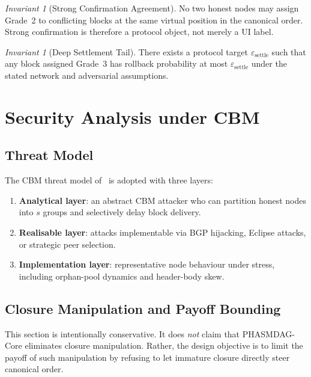 \documentclass[11pt]{article}
\theoremstyle{definition}
\theoremstyle{plain}
\theoremstyle{remark}
\newtheorem{invariant}[definition]{Invariant}
\begin{document}
\begin{invariant}[Strong Confirmation Agreement]\label{inv:strong}
No two honest nodes may assign Grade~2 to conflicting blocks at the same
virtual position in the canonical order.
Strong confirmation is therefore a protocol object, not merely a UI label.
\end{invariant}

\begin{invariant}[Deep Settlement Tail]\label{inv:settlement}
There exists a protocol target $\varepsilon_{\mathrm{settle}}$ such that any
block assigned Grade~3 has rollback probability at most
$\varepsilon_{\mathrm{settle}}$ under the stated network and adversarial
assumptions.
\end{invariant}

\section{Security Analysis under CBM}\label{sec:security}

\subsection{Threat Model}

The CBM threat model of~\cite{wu2024security} is adopted with three layers:

\begin{enumerate}[nosep]
    \item \textbf{Analytical layer}: an abstract CBM attacker who can partition
    honest nodes into $s$ groups and selectively delay block delivery.
    \item \textbf{Realisable layer}: attacks implementable via BGP hijacking,
    Eclipse attacks, or strategic peer selection.
    \item \textbf{Implementation layer}: representative node behaviour under
    stress, including orphan-pool dynamics and header-body skew.
\end{enumerate}

\subsection{Closure Manipulation and Payoff Bounding}\label{sec:incentive}

This section is intentionally conservative.
It does \emph{not} claim that PHASMDAG-Core eliminates closure manipulation.
Rather, the design objective is to limit the payoff of such manipulation by
refusing to let immature closure directly steer canonical order.
\end{document}
